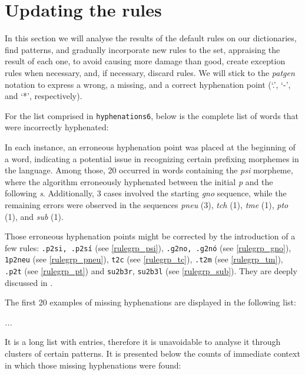 \section{Updating the rules}

In this section we will analyse the results of the default rules on our dictionaries,
find patterns, and gradually incorporate new rules to the set, appraising the result of
each one, to avoid causing more damage than good, create exception rules when necessary,
and, if necessary, discard rules. We will stick to the \emph{patgen} notation to express
a wrong, a missing, and a correct hyphenation point (`.', `-', and `*', respectively).

For the list comprised in \texttt{hyphenations6}, below is the complete list of
\NumberOfWrongSix{} words that were incorrectly hyphenated:
\begin{multicols}{3}
\setlength{\columnsep}{0pt}
\setlength{\parindent}{0pt}
\emph{}
\end{multicols}
In each instance, an erroneous hyphenation point was placed at the beginning of
a word, indicating a potential issue in recognizing certain prefixing morphemes
in the language.  Among those, 20 occurred in words containing the \emph{psi}
morpheme, where the algorithm erroneously hyphenated between the initial
\emph{p} and the following \emph{s}. Additionally, 3 cases involved the
starting \emph{gno} sequence, while the remaining errors were observed in the
sequences \emph{pneu} (3), \emph{tch} (1), \emph{tme} (1), \emph{pto} (1), and
\emph{sub} (1).

Those erroneous hyphenation points might be corrected by the introduction of a few rules:
\texttt{.p2si, .p2sí} (see \cref{rulegrp_psi}), \texttt{.g2no, .g2nó} (see \cref{rulegrp_gno}), 
\texttt{1p2neu} (see \cref{rulegrp_pneu}),
\texttt{t2c} (see \cref{rulegrp_tc}), \texttt{.t2m} (see \cref{rulegrp_tm}), \texttt{.p2t} (see \cref{rulegrp_pt}) 
and \texttt{su2b3r}, \texttt{su2b3l}  (see \cref{rulegrp_sub}). They are deeply 
discussed in .


The first 20 examples of missing hyphenations are displayed in the following list:
\begin{multicols}{3}
\setlength{\columnsep}{0pt}
\setlength{\parindent}{0pt}
\emph{
...}
\end{multicols}
It is a long list with \NumberOfMissingSix{} entries, therefore it is
unavoidable to analyse it through clusters of certain patterns. It is presented
below the counts of immediate context in which those missing hyphenations were
found:
\begin{multicols}{5}
\setlength{\columnsep}{0pt}
\setlength{\parindent}{0pt}
\emph{}
\end{multicols}

